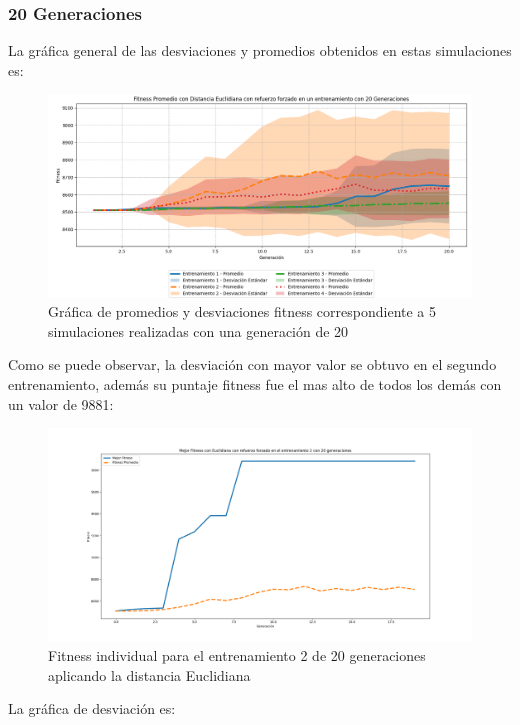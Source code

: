 \documentclass[conference]{IEEEtran}
\begin{document}
\subsubsection{20 Generaciones}
La gráfica general de las desviaciones y promedios obtenidos en estas simulaciones es:
\begin{figure}[H]
    \centering    \includegraphics[width=0.99 \linewidth]{Euclidiana/Fitness_Acumulado_Eucli_20Gen.png}
    \caption{Gráfica de promedios y desviaciones fitness correspondiente a 5 simulaciones realizadas con una generación de 20}
    \label{fig:Euclidiana_20_refuerzo}
\end{figure}
Como se puede observar, la desviación con mayor valor se obtuvo en el segundo entrenamiento, además su puntaje fitness fue el mas alto de todos los demás con un valor de 9881:
\begin{figure}[H]
    \centering
    \includegraphics[width=0.9\linewidth]{Euclidiana/Fitness_individual_20/Fitness_2_Eucli_20Gen.png}
    \caption{Fitness individual para el entrenamiento 2 de 20 generaciones aplicando la distancia Euclidiana}
    \label{fig:Fitnes_ecu_2_20_inv}
\end{figure}
La gráfica de desviación es:
\end{document}
